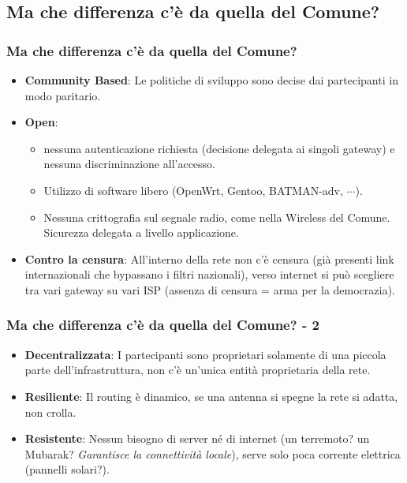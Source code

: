 \documentclass{beamer}
\begin{document}
\subsection{Ma che differenza c'è da quella del Comune?}
\begin{frame}\frametitle{Ma che differenza c'è da quella del Comune?}
\begin{itemize}
 \item \textbf{\color{blue}Community Based}: Le politiche di sviluppo sono decise dai partecipanti in modo paritario.
\pause
 \item \textbf{\color{blue}Open}: 
  \begin{itemize}
  \item nessuna autenticazione richiesta (decisione delegata ai singoli gateway) e nessuna discriminazione all'accesso.
  \item Utilizzo di software libero (OpenWrt, Gentoo, BATMAN-adv, $\cdots$).
  \item Nessuna crittografia sul segnale radio, come nella Wireless del Comune. Sicurezza delegata a livello applicazione.
  \end{itemize}
\pause
\item \textbf{\color{blue}Contro la censura}: All'interno della rete non c'è censura (già presenti link internazionali che bypassano i filtri nazionali), verso internet si può scegliere tra vari gateway su vari ISP (assenza di censura = arma per la democrazia).


\end{itemize}
\end{frame}
\begin{frame}\frametitle{Ma che differenza c'è da quella del Comune? - 2}
\begin{itemize}
 
 \item \textbf{\color{blue}Decentralizzata}: I partecipanti sono proprietari solamente di una piccola parte dell’infrastruttura, non c’è un'unica entità proprietaria della rete.
\pause
 \item \textbf{\color{blue}Resiliente}: Il routing è dinamico, se una antenna si spegne la rete si adatta, non crolla.

\pause
 \item \textbf{\color{blue}Resistente}: Nessun bisogno di server né di internet (un terremoto? un Mubarak? \emph{Garantisce la connettività locale}), serve solo poca corrente elettrica (pannelli solari?).
\end{itemize}
\end{frame}
\end{document}
